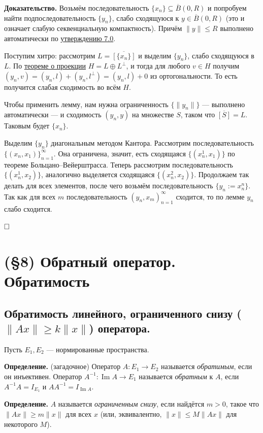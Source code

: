 \documentclass[12pt, a4paper]{article}
\DeclareMathOperator{\im}{Im}
\newcommand{\QED}{$\hfill\square$}
\renewcommand{\le}{\leqslant}  %
\renewcommand{\ge}{\geqslant}  %
\renewcommand{\subset}{\subseteq}   %
\begin{document}
\textbf{Доказательство.} Возьмём последовательность $\{x_n\} \subset \overline B(0, R)$ и попробуем найти подпоследовательность $\{y_n\}$, слабо сходящуюся к $y \in \overline B(0, R)$ (это и означает слабую секвенциальную компактность). Причём $\|y\| \le R$ выполнено автоматически по \hyperref[th:7-0]{утверждению 7.0}.

Поступим хитро: рассмотрим $L = \overline{[\{x_n\}]}$ и выделим $\{y_n\}$, слабо сходящуюся в $L$. По \hyperref[th:4-3]{теореме о проекции} $H = L \oplus L^\bot$, и тогда для любого $v \in H$ получим $(y_n, v) = (y_n, l) + (y_n, l^\bot) = (y_n, l) + 0$ из ортогональности. То есть получится слабая сходимость во всём $H$. 

Чтобы применить лемму, нам нужна ограниченность $\{\|y_n\|\}$ --- выполнено автоматически --- и сходимость $(y_n, y)$ на множестве $S$, таком что $\overline{[S]} = L$. Таковым будет $\{x_n\}$.

Выделим $\{y_n\}$ диагональным методом Кантора.
Рассмотрим последовательность \\ $\{(x_n, x_1)\}_{n=1}^\infty$.
Она ограничена, значит, есть сходящаяся $\{(x_n^1, x_1)\}$ по теореме Больцано--Вейерштрасса.
Теперь рассмотрим последовательность $\{(x_n^1, x_2)\}$, аналогично выделяется сходящаяся $\{(x_n^2, x_2)\}$.
Продолжаем так делать для всех элементов, после чего возьмём последовательность $\{y_n := x_n^n\}$.
Так как для всех $m$ последовательность ${(y_n, x_m)}_{n = 1}^\infty$ сходится, то по лемме $y_n$ слабо сходится.



\QED


\section{(§8) Обратный оператор. Обратимость}

\subsection{Обратимость линейного, ограниченного снизу (\texorpdfstring{$\|Ax\| \ge k\|x\|$}{||Ax|| >= k||x||}) оператора.}

Пусть $E_1, E_2$ --- нормированные пространства.

\textbf{Определение.} (загадочное) Оператор $A: E_1 \to E_2$ называется \textit{обратимым}, если он инъективен. Оператор $A^{-1}: \im A \to E_1$ называется \textit{обратным} к $A$, если $A^{-1}A = I_{E_1}$ и $AA^{-1} = I_{\im A}$.

\textbf{Определение.} $A$ называется \textit{ограниченным снизу}, если найдётся $m > 0$, такое что $\|A x\| \ge m \|x\|$ для всех $x$ (или, эквивалентно, $\|x\| \le M\|Ax\|$ для некоторого $M$).
\end{document}
